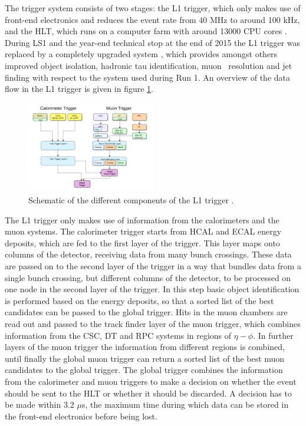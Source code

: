 The trigger system consists of two stages: the \ac{L1} trigger, which only makes use of
front-end electronics 
and reduces the event rate from 40 MHz to around 100 kHz, and the
\ac{HLT}, which runs on a computer farm with around 13000 CPU cores \cite{cms-trigger}.
During \ac{LS1} and the year-end technical stop at the end of 2015 the \ac{L1} trigger was
replaced by a completely upgraded system \cite{cms-trigger-tdr}, which provides amongst others 
improved object isolation, hadronic tau identification, muon \pT~resolution and
jet finding with respect to the system used during Run 1.
An overview of the data flow in the \ac{L1} trigger is given in figure \ref{fig:CMS_Trigger}.

\begin{figure}[h!]
\begin{center}
\includegraphics[width=0.5\textwidth]{./Detector/Plots/CMSTrigger.png}
\caption{Schematic of the different components of the \ac{L1} trigger \cite{cms-trigger-tdr}.}
\label{fig:CMS_Trigger}
\end{center}
\end{figure}


The \ac{L1} trigger only makes use of information from the calorimeters and the muon systems.
The calorimeter trigger starts from \ac{HCAL} and \ac{ECAL} energy deposits, 
which are fed to the first layer of the trigger. This layer maps onto
columns of the detector, receiving data from many bunch crossings. These data are passed
on to the second layer of the trigger in a way that bundles data from a single bunch crossing, but
different columns of the detector, to be processed on one node in the second layer of the
trigger. In this step basic object identification is performed based on the energy
deposits, so that a sorted list of the best candidates can be passed to the global trigger.
Hits in the muon chambers are read out and passed to the track finder layer 
of the muon trigger, which combines information from the CSC, \ac{DT}
and RPC systems in regions of $\eta-\phi$.
In further layers of the muon trigger the information from different
regions is combined, until finally the global muon trigger
can return a sorted list of the best muon candidates to the global trigger.
The global trigger combines the information from the calorimeter and muon triggers
to make a decision on whether the event should be sent to the \ac{HLT} or whether
it should be discarded. A decision has to be made within 3.2 $\mu$s, the maximum time during
which data can be stored in the front-end electronics before being lost.

